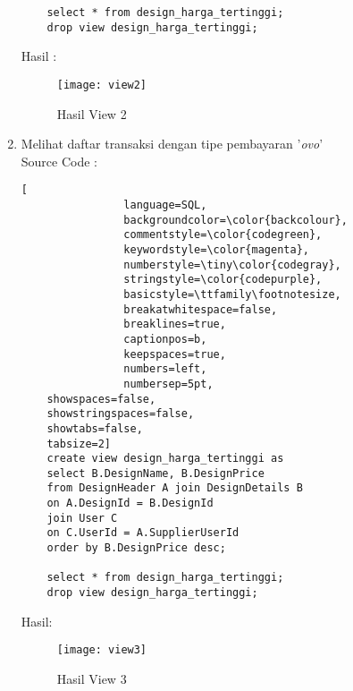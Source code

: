 \begin{enumerate}
\begin{lstlisting}
	select * from design_harga_tertinggi;
	drop view design_harga_tertinggi;
			\end{lstlisting}
		Hasil : 
		\\
		\begin{figure}[H]
			\centering
			\texttt{[image: view2]}
			\caption{Hasil View 2}
		\end{figure}
	
	\item 	Melihat daftar transaksi dengan tipe pembayaran '\textit{ovo}' \\
			Source Code :
			\begin{lstlisting}[
				language=SQL,
				backgroundcolor=\color{backcolour},   
				commentstyle=\color{codegreen},
				keywordstyle=\color{magenta},
				numberstyle=\tiny\color{codegray},
				stringstyle=\color{codepurple},
				basicstyle=\ttfamily\footnotesize,
				breakatwhitespace=false,         
				breaklines=true,                 
				captionpos=b,                    
				keepspaces=true,                 
				numbers=left,                    
				numbersep=5pt,                  
	showspaces=false,                
	showstringspaces=false,
	showtabs=false,                  
	tabsize=2]
	create view design_harga_tertinggi as
	select B.DesignName, B.DesignPrice
	from DesignHeader A join DesignDetails B
	on A.DesignId = B.DesignId
	join User C
	on C.UserId = A.SupplierUserId
	order by B.DesignPrice desc;
	
	select * from design_harga_tertinggi;
	drop view design_harga_tertinggi;
			\end{lstlisting}
		Hasil:
		\\
		\begin{figure}[H]
			\centering
			\texttt{[image: view3]}
			\caption{Hasil View 3}
		\end{figure}
\end{enumerate}
